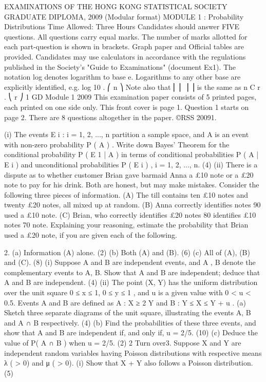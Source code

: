 EXAMINATIONS OF THE HONG KONG STATISTICAL SOCIETY
GRADUATE DIPLOMA, 2009
(Modular format)
MODULE 1 : Probability Distributions
Time Allowed: Three Hours
Candidates should answer FIVE questions.
All questions carry equal marks.
The number of marks allotted for each part-question is shown in brackets.
Graph paper and Official tables are provided.
Candidates may use calculators in accordance with the regulations published in
the Society's "Guide to Examinations" (document Ex1).
The notation log denotes logarithm to base e.
Logarithms to any other base are explicitly identified, e.g. log 10 .
⎛ n ⎞
Note also that ⎜ ⎜ ⎟ ⎟ is the same as n C r .
⎝ r ⎠
1
GD Module 1 2009
This examination paper consists of 5 printed pages, each printed on one side only.
This front cover is page 1.
Question 1 starts on page 2.
There are 8 questions altogether in the paper.
©RSS 20091.

(i)
The events { E i : i = 1, 2, ..., n } partition a sample space, and A is an event with
non-zero probability P ( A ) . Write down Bayes' Theorem for the conditional
probability P ( E 1 | A ) in terms of conditional probabilities P ( A | E i ) and
unconditional probabilities P ( E i ) , i = 1, 2, ..., n.
(4)
(ii)
There is a dispute as to whether customer Brian gave barmaid Anna a £10 note
or a £20 note to pay for his drink. Both are honest, but may make mistakes.
Consider the following three pieces of information.
(A) The till contains ten £10 notes and twenty £20 notes, all mixed up at
random.
(B) Anna correctly identifies notes 90%
used a £10 note.
(C) Brian, who correctly identifies £20 notes 80%
identifies £10 notes 70%
note.
Explaining your reasoning, estimate the probability that Brian used a £20 note,
if you are given each of the following.

2.
(a) Information (A) alone. (2)
(b) Both (A) and (B). (6)
(c) All of (A), (B) and (C). (8)
(i) Suppose A and B are independent events, and A , B denote the complementary
events to A, B. Show that A and B are independent; deduce that A and B
are independent.
(4)
(ii) The point (X, Y) has the uniform distribution over the unit square
{ 0 ≤ x ≤ 1, 0 ≤ y ≤ 1} , and u is a given value with 0 < u < 0.5. Events A and B
are defined as A :{ X ≥ 2 Y } and B :{ Y ≤ X ≤ Y + u } .
(a) Sketch three separate diagrams of the unit square, illustrating the events
A, B and A ∩ B respectively.
(4)
(b) Find the probabilities of these three events, and show that A and B are
independent if, and only if, u = 2/5.
(10)
(c) Deduce the value of P( A ∩ B ) when u = 2/5.
(2)
2
Turn over3.
Suppose X and Y are independent random variables having Poisson distributions with
respective means λ ( > 0) and μ ( > 0).
(i)
Show that X + Y also follows a Poisson distribution.
(5)

